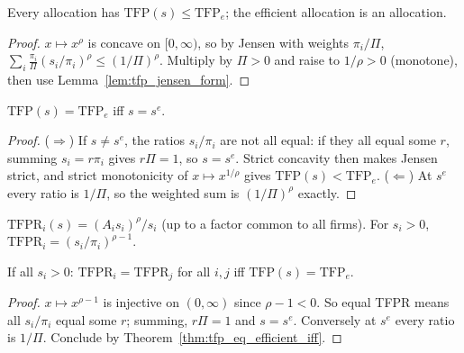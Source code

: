 \begin{theorem}
\label{thm:tfp_le_efficient}
\leanok
{}
Every allocation has $\mathrm{TFP}(s) \le \mathrm{TFP}_e$; the efficient allocation is an allocation.
\end{theorem}
\begin{proof}
\leanok
$x \mapsto x^\rho$ is concave on $[0, \infty)$, so by Jensen with weights $\pi_i/\Pi$,
$\sum_i \frac{\pi_i}{\Pi}(s_i/\pi_i)^\rho \le (1/\Pi)^\rho$. Multiply by $\Pi > 0$ and raise to $1/\rho > 0$
(monotone), then use Lemma~\ref{lem:tfp_jensen_form}.
\end{proof}

\begin{theorem}
\label{thm:tfp_eq_efficient_iff}
\leanok
{}
$\mathrm{TFP}(s) = \mathrm{TFP}_e$ iff $s = s^e$.
\end{theorem}
\begin{proof}
\leanok
($\Rightarrow$) If $s \neq s^e$, the ratios $s_i/\pi_i$ are not all equal: if they all equal some $r$, summing
$s_i = r\pi_i$ gives $r\Pi = 1$, so $s = s^e$. Strict concavity then makes Jensen strict, and strict monotonicity
of $x \mapsto x^{1/\rho}$ gives $\mathrm{TFP}(s) < \mathrm{TFP}_e$. ($\Leftarrow$) At $s^e$ every ratio is $1/\Pi$,
so the weighted sum is $(1/\Pi)^\rho$ exactly.
\end{proof}

\begin{definition}
\label{def:tfpr}
\leanok
{}
$\mathrm{TFPR}_i(s) = (A_i s_i)^\rho / s_i$ (up to a factor common to all firms). For $s_i > 0$,
$\mathrm{TFPR}_i = (s_i/\pi_i)^{\rho - 1}$.
\end{definition}

\begin{theorem}
\label{thm:tfpr_equal_iff}
\leanok
{}
If all $s_i > 0$: $\mathrm{TFPR}_i = \mathrm{TFPR}_j$ for all $i, j$ iff $\mathrm{TFP}(s) = \mathrm{TFP}_e$.
\end{theorem}
\begin{proof}
\leanok
$x \mapsto x^{\rho-1}$ is injective on $(0, \infty)$ since $\rho - 1 < 0$. So equal TFPR means all $s_i/\pi_i$ equal
some $r$; summing, $r\Pi = 1$ and $s = s^e$. Conversely at $s^e$ every ratio is $1/\Pi$. Conclude by
Theorem~\ref{thm:tfp_eq_efficient_iff}.
\end{proof}


